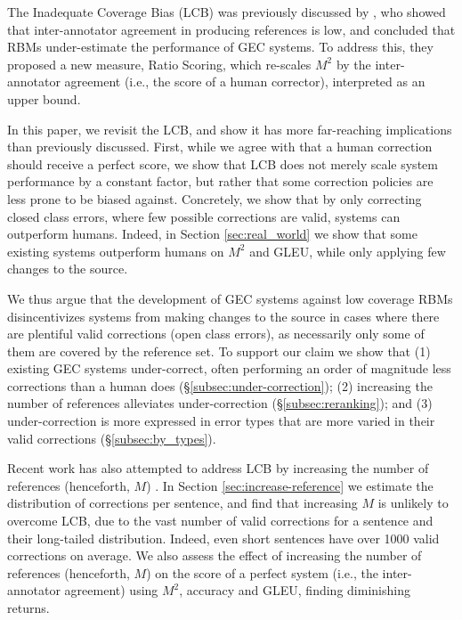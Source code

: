 \documentclass[a4paper]{article}
\begin{document}
  The Inadequate Coverage Bias (LCB) was previously discussed by \citet{bryant2015far}, 
  who showed that inter-annotator agreement in producing references is low, 
  and concluded that RBMs under-estimate the performance of GEC systems.
  To address this, they proposed a new measure, Ratio Scoring, which re-scales $M^2$ 
  by the inter-annotator agreement (i.e., the score of a human corrector), interpreted as an upper bound.

  In this paper, we revisit the LCB, and show it has more far-reaching implications than previously discussed. 
  First, while we agree with \citet{bryant2015far} that a human correction should receive a perfect score, 
  we show that LCB does not merely scale system performance by a constant factor, but
  rather that some correction policies are less prone to be biased against. 
  Concretely, we show that by only correcting closed class errors, where few possible corrections are valid, systems can outperform humans. 
  Indeed, in Section \ref{sec:real_world} we show that some existing systems outperform humans on $M^2$ and GLEU, while only applying few changes to the source.
  
  We thus argue that the development of GEC systems against low coverage RBMs disincentivizes systems from making changes to the source 
  in cases where there are plentiful valid corrections (open class errors), as necessarily only some of them are covered by the reference set. 
  To support our claim we show that (1) existing GEC systems under-correct, often performing an order of magnitude less corrections than a human does (\S\ref{subsec:under-correction});
  (2) increasing the number of references alleviates under-correction (\S\ref{subsec:reranking});
  and (3) under-correction is more expressed in error types that are more varied in their valid corrections (\S\ref{subsec:by_types}).
  
  Recent work has also attempted to address LCB by increasing the number of references 
  (henceforth, $M$) \cite{bryant2015far,sakaguchi2016reassessing}.
  In Section \ref{sec:increase-reference} we estimate the distribution of corrections per sentence, 
  and find that increasing $M$ is unlikely to overcome LCB, due
  to the vast number of valid corrections for a sentence and their long-tailed distribution.
  Indeed, even short sentences have over 1000 valid corrections on average. 
  We also assess the effect of increasing the number of references (henceforth, $M$) on 
  the score of a perfect system (i.e., the inter-annotator agreement) 
  using $M^2$, accuracy and GLEU, finding diminishing returns. 
\end{document}

